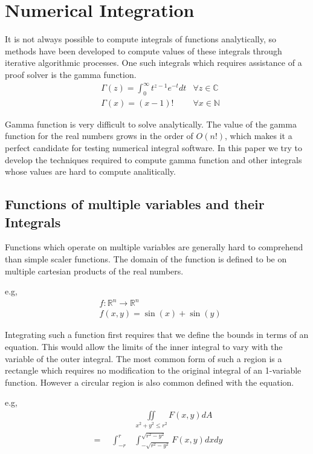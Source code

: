 \documentclass{article}
\begin{document}
\tableofcontents
\hypersetup{linktocpage}
\newpage

\section*{Numerical Integration}

It is not always possible to compute integrals of functions analytically, so methods have been
developed to compute values of these integrals through iterative algorithmic processes. One such
integrals which requires assistance of a proof solver is the gamma function.
\begin{align*}
	&\Gamma(z) = \int^\infty_0 t^{z-1} e^{-t} dt &\forall z \in \mathbb{C}\\
	&\Gamma(x) = (x - 1)! &\forall x \in \mathbb{N}
\end{align*}

Gamma function is very difficult to solve analytically. The value of the gamma function for the real numbers
grows in the order of $O(n!)$, which makes it a perfect candidate for testing numerical integral software.
In this paper we try to develop the techniques required to compute gamma function and other integrals whose
values are hard to compute analitically.

\subsection*{Functions of multiple variables and their Integrals}

Functions which operate on multiple variables are generally hard to comprehend than simple scaler functions.
The domain of the function is defined to be on multiple cartesian products of the real numbers.

e.g,
\begin{align*}
	&f : \mathbb{R}^{n} \rightarrow \mathbb{R}^{n}\\
	&f(x, y) = \sin(x) + \sin(y)
\end{align*}

Integrating such a function first requires that we define the bounds in terms of an equation. This would allow
the limits of the inner integral to vary with the variable of the outer integral. The most common form of such
a region is a rectangle which requires no modification to the original integral of an 1-variable function. However
a circular region is also common defined with the equation.

e.g,
\begin{align*}
	&\iint\limits_{x^2 + y^2 \le r^2} F(x, y) dA\\
	=\quad\int^r_{-r}&\int^{\sqrt{r^2 - y^2}}_{-\sqrt{r^2 - y^2}} F(x, y) dx dy\\
\end{align*}
\end{document}
